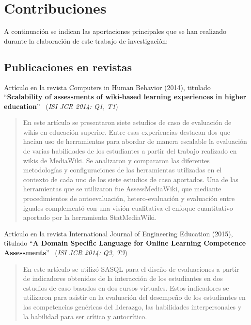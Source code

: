 \section{Contribuciones} \label{eva:contribuciones}

	A continuación se indican las aportaciones principales que se han realizado durante la elaboración de este trabajo de investigación:

	\subsection*{Publicaciones en revistas}


Artículo en la revista Computers in Human Behavior (2014), titulado ``\textbf{Scalability of assessments of wiki-based learning experiences in higher education}''~\cite{palomo2014scalability} (\emph{ISI JCR 2014: Q1, T1})

\begin{quote}En este artículo se presentaron siete estudios de caso de evaluación de wikis en educación superior. Entre esas experiencias destacan dos que hacían uso de herramientas para abordar de manera escalable la evaluación de varias habilidades de los estudiantes a partir del trabajo realizado en wikis de MediaWiki. Se analizaron y compararon las diferentes metodologías y configuraciones de las herramientas utilizadas en el contexto de cada uno de los siete estudios de caso aportados. Una de las herramientas que se utilizaron fue AssessMediaWiki, que mediante procedimientos de autoevaluación, hetero-evaluación y evaluación entre iguales complementó con una visión cualitativa el enfoque cuantitativo aportado por la herramienta StatMediaWiki.\end{quote}

\noindent
Artículo en la revista International Journal of Engineering Education (2015), titulado ``\textbf{A Domain Specific Language for Online Learning Competence Assessments}''~\cite{Balderas:2015} (\emph{ISI JCR 2014: Q3, T3})

\begin{quote}En este artículo se utilizó SASQL para el diseño de evaluaciones a partir de indicadores obtenidos de la interacción de los estudiantes en dos estudios de caso basados en dos cursos virtuales. Estos indicadores se utilizaron para asistir en la evaluación del desempeño de los estudiantes en las competencias genéricas del liderazgo, las habilidades interpersonales y la habilidad para ser crítico y autocrítico.\end{quote}

